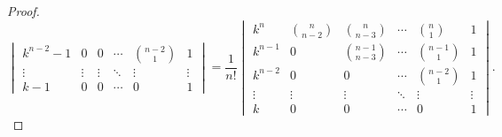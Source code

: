 \documentclass[class=linear-algebra,crop=false]{standalone}
\begin{document}
\begin{proof}
\[\begin{vmatrix}
			k^{n-2} - 1 & 0              & 0                & \cdots & \binom{n-2}{1} & 1      \\
			\vdots      & \vdots         & \vdots           & \ddots & \vdots         & \vdots \\
			k - 1       & 0              & 0                & \cdots & 0              & 1
		\end{vmatrix}
		= \dfrac{1}{n!}
		\begin{vmatrix}
			k^{n}   & \binom{n}{n-2} & \binom{n}{n-3}   & \cdots & \binom{n}{1}   & 1      \\
			k^{n-1} & 0              & \binom{n-1}{n-3} & \cdots & \binom{n-1}{1} & 1      \\
			k^{n-2} & 0              & 0                & \cdots & \binom{n-2}{1} & 1      \\
			\vdots  & \vdots         & \vdots           & \ddots & \vdots         & \vdots \\
			k       & 0              & 0                & \cdots & 0              & 1
		\end{vmatrix}.
	\]
\end{proof}
\end{document}
